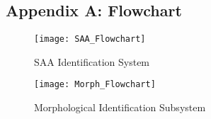 \subsection{Appendix A: Flowchart}

\begin{figure}[H]
	\center 
	\texttt{[image: SAA\_Flowchart]}
	\caption[SAA Identification System]{SAA Identification System}
\end{figure}

\newpage  %

\begin{figure}[H]
	\center 
	\texttt{[image: Morph\_Flowchart]}
	\caption[Morphological Identification Subsystem]{Morphological Identification Subsystem}
\end{figure}

\newpage  %